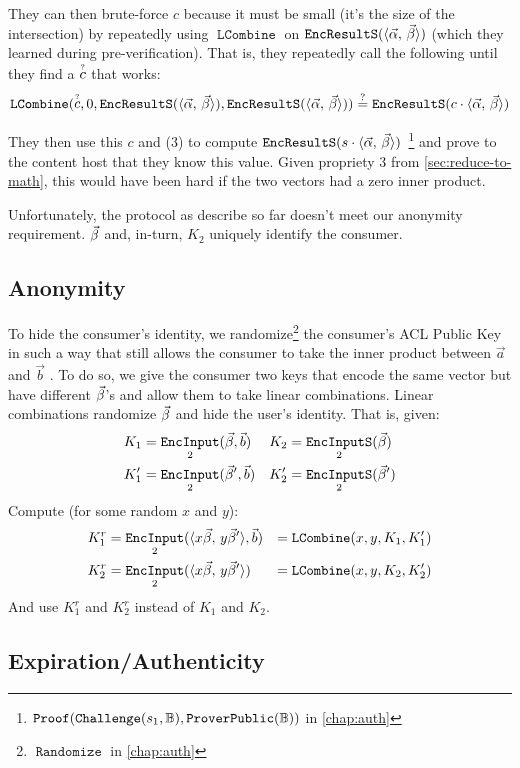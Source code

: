 \documentclass[pdftex,12pt,a4papaer,twoside,notitlepage]{report}
\newcommand{\iprod}[2]{\langle #1,\,#2\rangle}
\DeclareMathOperator{\ein}{\mathtt{EncInput}}
\DeclareMathOperator{\combine}{\mathtt{LCombine}}
\DeclareMathOperator{\eins}{\mathtt{EncInputS}}
\DeclareMathOperator{\eouts}{\mathtt{EncResultS}}
\DeclareMathOperator{\Proof}{\mathtt{Proof}}
\DeclareMathOperator{\rand}{\mathtt{Randomize}}
\begin{document}
They can then brute-force $c$ because it must be small (it's the size of the
intersection) by repeatedly using $\combine$ on $\eouts(\ABp)$ (which they
learned during pre-verification). That is, they repeatedly call the following 
until they find a $\stackrel{\text{\tiny?}}{c}$ that works:
\begin{align*}
  \combine(\stackrel{\text{\tiny ?}}{c}, 0, \eouts(\ABp), \eouts(\ABp)) \stackrel{?}{=} \eouts(c\cdot\ABp)
\end{align*}

They then use this $c$ and (3) to compute $\eouts(s\cdot\ABp)$~\footnote{$\Proof(\Cv,
\Pv)$ in \cref{chap:auth}} and prove to the content host that they know this
value. Given propriety 3 from \cref{sec:reduce-to-math}, this would have been
hard if the two vectors had a zero inner product.

Unfortunately, the protocol as describe so far doesn't meet our anonymity
requirement. $\vec{\beta}$ and, in-turn, $K_2$ uniquely identify the consumer.

\subsection{Anonymity}
\label{sec:anon-crypto}

To hide the consumer's identity, we randomize\footnote{$\rand$ in
  \cref{chap:auth}} the consumer's ACL Public Key in such a way that still
allows the consumer to take the inner product between $\vec{a}$ and $\vec{b}$ .
To do so, we give the consumer two keys that encode the same vector but have
different $\vec{\beta}$'s and allow them to take linear combinations. Linear
combinations randomize $\vec{\beta}$ and hide the user's identity. That is, given:
\begin{align*}
  K_1 &= \ein_2(\Bp, \vec{b}) & K_2 &= \eins_2(\Bp) \\
  K^\prime_1 &= \ein_2(\Bp^\prime, \vec{b}) & K^\prime_2 &= \eins_2(\Bp^\prime)
\end{align*}
Compute (for some random $x$ and $y$):
\begin{align*}
  K^r_1 &= \ein_2(\iprod{x\Bp}{y\Bp^\prime}, \vec{b}) &= \combine(x, y, K_1, K_1^\prime) \\
  K^r_2 &= \ein_2(\iprod{x\Bp}{y\Bp^\prime}) &= \combine(x, y, K_2, K_2^\prime) \\
\end{align*}
And use $K_1^r$ and $K_2^r$ instead of $K_1$ and $K_2$.

\subsection{Expiration/Authenticity}
\end{document}
